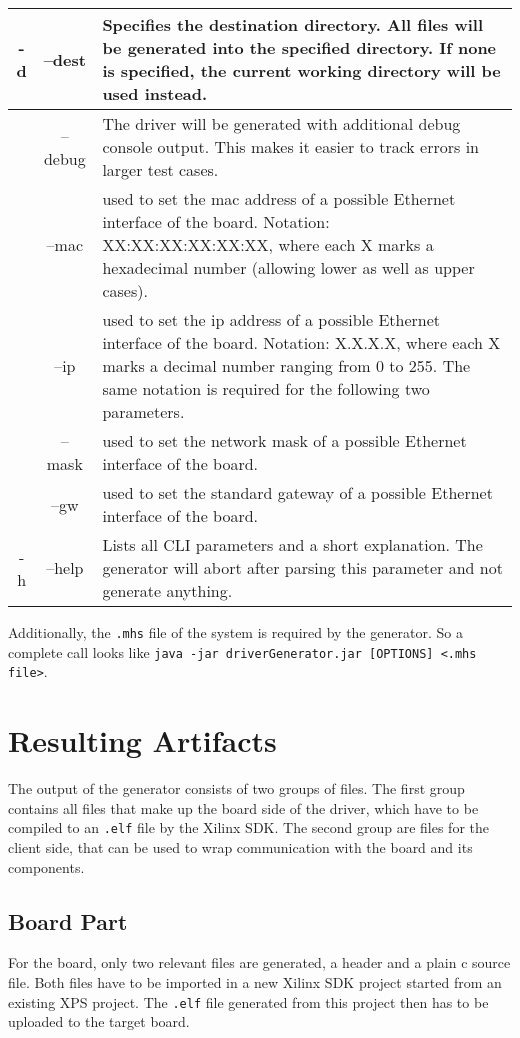 \documentclass{report}
\begin{document}
\begin{table}
\centering
\begin{tabular}{ cc | p{9cm} }
-d & --dest & Specifies the destination directory. All files will be generated into the specified directory. If none is specified, the current working directory will be used instead.\\ \hline
& --debug & The driver will be generated with additional debug console output. This makes it easier to track errors in larger test cases.\\ \hline
& --mac & used to set the mac address of a possible Ethernet interface of the board. Notation: XX:XX:XX:XX:XX:XX, where each X marks a hexadecimal number (allowing lower as well as upper cases).\\
& --ip & used to set the ip address of a possible Ethernet interface of the board. Notation: X.X.X.X, where each X marks a decimal number ranging from 0 to 255. The same notation is required for the following two parameters.\\
& --mask & used to set the network mask of a possible Ethernet interface of the board.\\
& --gw & used to set the standard gateway of a possible Ethernet interface of the board. \color{red}{Note that these four parameters are only contemporary and will be replaced by the new board description language (I hope).}\\ \hline
-h & --help & Lists all CLI parameters and a short explanation. The generator will abort after parsing this parameter and not generate anything.
\end{tabular}
\end{table}

Additionally, the \texttt{.mhs} file of the system is required by the generator. So a complete call looks like \texttt{java -jar driverGenerator.jar [OPTIONS] <.mhs file>}.

\section{Resulting Artifacts}
The output of the generator consists of two groups of files. The first group contains all files that make up the board side of the driver, which have to be compiled to an \texttt{.elf} file by the Xilinx SDK. The second group are files for the client side, that can be used to wrap communication with the board and its components.

\subsection{Board Part}
For the board, only two relevant files are generated, a header and a plain c source file. Both files have to be imported in a new Xilinx SDK project started from an existing XPS project. The \texttt{.elf} file generated from this project then has to be uploaded to the target board.
\end{document}

